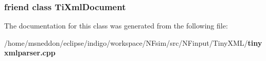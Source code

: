 \subsubsection{\setlength{\rightskip}{0pt plus 5cm}friend class {\bf TiXmlDocument}\hspace{0.3cm}{\tt  [friend]}}\label{classTiXmlParsingData_173617f6dfe902cf484ce5552b950475}




The documentation for this class was generated from the following file:\begin{CompactItemize}
\item 
/home/msneddon/eclipse/indigo/workspace/NFsim/src/NFinput/TinyXML/{\bf tinyxmlparser.cpp}\end{CompactItemize}
